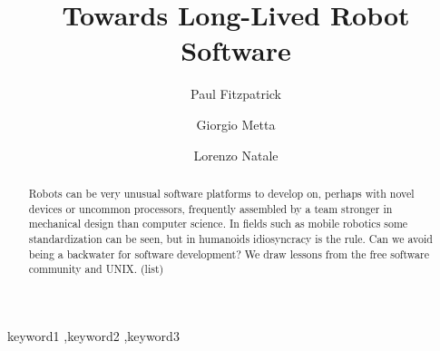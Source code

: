 \begin{frontmatter}



\title{Towards Long-Lived Robot Software}


\author[at_iit]{Paul Fitzpatrick}
\author[at_iit,at_dist]{Giorgio Metta}
\author[at_iit]{Lorenzo Natale}

\address[at_iit]{IIT Address}
\address[at_dist]{DIST Address}

\begin{abstract}

Robots can be very unusual software platforms to develop on, perhaps
with novel devices or uncommon processors, frequently assembled by a
team stronger in mechanical design than computer science.  In fields
such as mobile robotics some standardization can be seen, but in
humanoids idiosyncracy is the rule.  Can we avoid being a backwater for
software development?  We draw lessons from the free software community
and UNIX. (list)






\end{abstract}

\begin{keyword}

keyword1 \sep keyword2 \sep keyword3


\end{keyword}

\end{frontmatter}


